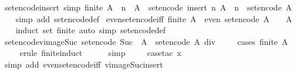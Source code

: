 \begin{isabellebody}
\endisatagproof
{\isafoldproof}%
%
\isadelimproof
\isanewline
%
\endisadelimproof
\isanewline
{}\isamarkupfalse%
\ set{\isacharunderscore}encode{\isacharunderscore}insert\ {\isacharbrackleft}simp{\isacharbrackright}{\isacharcolon}\ {\isachardoublequoteopen}finite\ A\ {\isasymLongrightarrow}\ n\ {\isasymnotin}\ A\ {\isasymLongrightarrow}\ set{\isacharunderscore}encode\ {\isacharparenleft}insert\ n\ A{\isacharparenright}\ {\isacharequal}\ {}{\isacharcircum}n\ {\isacharplus}\ set{\isacharunderscore}encode\ A{\isachardoublequoteclose}\isanewline
%
\isadelimproof
\ \ %
\endisadelimproof
%
\isatagproof
{}\isamarkupfalse%
\ {\isacharparenleft}simp\ add{\isacharcolon}\ set{\isacharunderscore}encode{\isacharunderscore}def{\isacharparenright}%
\endisatagproof
{\isafoldproof}%
%
\isadelimproof
\isanewline
%
\endisadelimproof
\isanewline
{}\isamarkupfalse%
\ even{\isacharunderscore}set{\isacharunderscore}encode{\isacharunderscore}iff{\isacharcolon}\ {\isachardoublequoteopen}finite\ A\ {\isasymLongrightarrow}\ even\ {\isacharparenleft}set{\isacharunderscore}encode\ A{\isacharparenright}\ {\isasymlongleftrightarrow}\ {}\ {\isasymnotin}\ A{\isachardoublequoteclose}\isanewline
%
\isadelimproof
\ \ %
\endisadelimproof
%
\isatagproof
{}\isamarkupfalse%
\ {\isacharparenleft}induct\ set{\isacharcolon}\ finite{\isacharparenright}\ {\isacharparenleft}auto\ simp{\isacharcolon}\ set{\isacharunderscore}encode{\isacharunderscore}def{\isacharparenright}%
\endisatagproof
{\isafoldproof}%
%
\isadelimproof
\isanewline
%
\endisadelimproof
\isanewline
{}\isamarkupfalse%
\ set{\isacharunderscore}encode{\isacharunderscore}vimage{\isacharunderscore}Suc{\isacharcolon}\ {\isachardoublequoteopen}set{\isacharunderscore}encode\ {\isacharparenleft}Suc\ {\isacharminus}{\isacharbackquote}\ A{\isacharparenright}\ {\isacharequal}\ set{\isacharunderscore}encode\ A\ div\ {}{\isachardoublequoteclose}\isanewline
%
\isadelimproof
\ \ %
\endisadelimproof
%
\isatagproof
{}\isamarkupfalse%
\ {\isacharparenleft}cases\ {\isachardoublequoteopen}finite\ A{\isachardoublequoteclose}{\isacharparenright}\isanewline
\ \ \ \isamarkupfalse%
\ {\isacharparenleft}erule\ finite{\isacharunderscore}induct{\isacharparenright}\isanewline
\ \ \ \ \isamarkupfalse%
\ simp\isanewline
\ \ \ \isamarkupfalse%
\ {\isacharparenleft}case{\isacharunderscore}tac\ x{\isacharparenright}\isanewline
\ \ \ \ \isamarkupfalse%
\ {\isacharparenleft}simp\ add{\isacharcolon}\ even{\isacharunderscore}set{\isacharunderscore}encode{\isacharunderscore}iff\ vimage{\isacharunderscore}Suc{\isacharunderscore}insert{\isacharunderscore}{}{\isacharparenright}\isanewline

\end{isabellebody}
